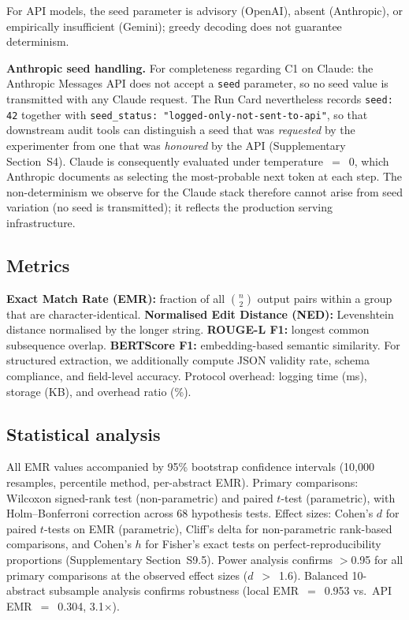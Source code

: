 \documentclass[sn-nature]{sn-jnl}
\begin{document}
For API models, the seed parameter is advisory (OpenAI\cite{openai2024seed}), absent (Anthropic), or empirically insufficient (Gemini); greedy decoding does not guarantee determinism\cite{ouyang2024nondeterminism}.

\textbf{Anthropic seed handling.}
For completeness regarding C1 on Claude: the Anthropic Messages API does not accept a \texttt{seed} parameter, so no seed value is transmitted with any Claude request.
The Run Card nevertheless records \texttt{seed: 42} together with \texttt{seed\_status: "logged-only-not-sent-to-api"}, so that downstream audit tools can distinguish a seed that was \emph{requested} by the experimenter from one that was \emph{honoured} by the API (Supplementary Section~S4).
Claude is consequently evaluated under temperature~$=$~0, which Anthropic documents as selecting the most-probable next token at each step.
The non-determinism we observe for the Claude stack therefore cannot arise from seed variation (no seed is transmitted); it reflects the production serving infrastructure.


\subsection{Metrics}\label{subsec:metrics}

\textbf{Exact Match Rate (EMR):} fraction of all $\binom{n}{2}$ output pairs within a group that are character-identical.
\textbf{Normalised Edit Distance (NED):} Levenshtein distance\cite{levenshtein1966binary} normalised by the longer string.
\textbf{ROUGE-L F1:} longest common subsequence overlap\cite{lin2004rouge}.
\textbf{BERTScore F1:} embedding-based semantic similarity\cite{zhang2020bertscore}.
For structured extraction, we additionally compute JSON validity rate, schema compliance, and field-level accuracy.
Protocol overhead: logging time (ms), storage (KB), and overhead ratio (\%).


\subsection{Statistical analysis}\label{subsec:stats}

All EMR values accompanied by 95\% bootstrap confidence intervals (10{,}000 resamples, percentile method, per-abstract EMR)\cite{efron1993introduction}.
Primary comparisons: Wilcoxon signed-rank test (non-parametric) and paired $t$-test (parametric), with Holm--Bonferroni correction across 68 hypothesis tests.
Effect sizes: Cohen's $d$ for paired $t$-tests on EMR (parametric), Cliff's delta\cite{romano2006appropriate} for non-parametric rank-based comparisons, and Cohen's $h$ for Fisher's exact tests on perfect-reproducibility proportions (Supplementary Section~S9.5).
Power analysis confirms $>$0.95 for all primary comparisons at the observed effect sizes ($d$~$>$~1.6)\cite{cohen1988statistical}.
Balanced 10-abstract subsample analysis confirms robustness (local EMR~$=$~0.953 vs.\ API EMR~$=$~0.304, 3.1$\times$).
\end{document}
